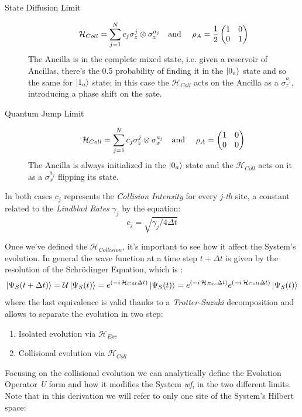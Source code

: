 \documentclass[a4paper,12pt]{article}
\begin{document}
	\begin{description}
		\item[State Diffusion Limit]
		\begin{equation}
			\mathcal{H}_{Coll} = \sum_{j=1}^{N}{c_j \sigma_{z}^{j} \otimes \sigma_{z}^{a_j}} \text{\quad and \quad} \rho_{A} = \frac{1}{2} \begin{pmatrix} 1 & 0 \\ 0 & 1 \end{pmatrix}
			\label{eq:diff_initialization}
		\end{equation}
		The Ancilla is in the complete mixed state, i.e. given a reservoir of Ancillas, there's the 0.5 probability of finding it in the $ \ket{0_a} $ state and so the same for $ \ket{1_a} $ state; in this case  the $ \mathcal{H}_{Coll} $ acts on the Ancilla as a $ \sigma_{z}^{a_j} $, introducing a phase shift on the sate.
		\item[Quantum Jump Limit]
		\begin{equation}
			\mathcal{H}_{Coll} = \sum_{j=1}^{N}{c_j \sigma_{z}^{j} \otimes \sigma_{x}^{a_j}} \text{\quad and \quad} \rho_{A} = \begin{pmatrix} 1 & 0 \\ 0 & 0 \end{pmatrix}
			\label{eq:QJ_initialization}
		\end{equation}
		The Ancilla is always initialized in the $ \ket{0_a} $ state and the $ \mathcal{H}_{Coll} $ acts on it as a $ \sigma_{x}^{a_j} $ flipping its state.
	\end{description}
	In both cases $ c_j $ represents the \textit{Collision Intensity} for every \textit{j-th} site, a constant related to the \textit{Lindblad Rates} $ \gamma_j $ by the equation:
	\begin{equation}
		c_j = \sqrt{\gamma_j / 4\Delta t}
		\label{eq:c_j_definition}
	\end{equation}


	Once we've defined the $ \mathcal{H}_{Collision} $, it's important to see how it affect the System's evolution. In general the wave function at a time step $ t + \Delta t $ is given by the resolution of the Schr\"odinger Equation, which is :
	\begin{equation}
		\ket{\Psi_S (t + \Delta t)} = \mathcal{U} \ket{\Psi_S (t)} = e^{\left(-i \, \mathcal{H}_{CM} \Delta t\right)}\ket{\Psi_S (t)} = e^{\left(-i \, \mathcal{H}_{Exc} \Delta t\right)} e^{\left(-i \, \mathcal{H}_{Coll} \Delta t\right)}\ket{\Psi_S (t)}
		\label{eq:wf_evolution}
	\end{equation}
	where the last equivalence is valid thanks to a \textit{Trotter-Suzuki} decomposition and allows to separate the evolution in two step:
	\begin{enumerate}
		\item Isolated evolution via $ \mathcal{H}_{Exc} $
		\item Collisional evolution via $ \mathcal{H}_{Coll} $
	\end{enumerate}
	Focusing on the collisional evolution we can analytically define the Evolution Operator \textit{U} form and how it modifies the System \textit{wf}, in the two different limits. Note that in this derivation we will refer to only one site of the System's Hilbert space:
\end{document}
